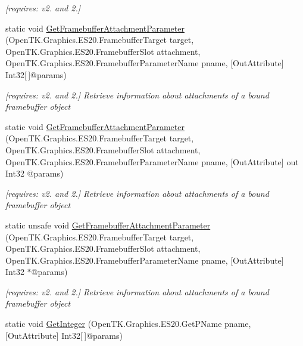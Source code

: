 \begin{DoxyCompactItemize}
\begin{DoxyCompactList}\small\item\em \mbox{[}requires\-: v2. and 2.\mbox{]}\end{DoxyCompactList}\item 
static void \hyperlink{class_open_t_k_1_1_graphics_1_1_e_s20_1_1_g_l_a0c54f4b1c208f1ace3f5b829b8820fed}{Get\-Framebuffer\-Attachment\-Parameter} (Open\-T\-K.\-Graphics.\-E\-S20.\-Framebuffer\-Target target, Open\-T\-K.\-Graphics.\-E\-S20.\-Framebuffer\-Slot attachment, Open\-T\-K.\-Graphics.\-E\-S20.\-Framebuffer\-Parameter\-Name pname, \mbox{[}Out\-Attribute\mbox{]} Int32\mbox{[}$\,$\mbox{]}@params)
\begin{DoxyCompactList}\small\item\em \mbox{[}requires\-: v2. and 2.\mbox{]} Retrieve information about attachments of a bound framebuffer object \end{DoxyCompactList}\item 
static void \hyperlink{class_open_t_k_1_1_graphics_1_1_e_s20_1_1_g_l_aee8f6f2a03c6cfccf9c15a876951eaa4}{Get\-Framebuffer\-Attachment\-Parameter} (Open\-T\-K.\-Graphics.\-E\-S20.\-Framebuffer\-Target target, Open\-T\-K.\-Graphics.\-E\-S20.\-Framebuffer\-Slot attachment, Open\-T\-K.\-Graphics.\-E\-S20.\-Framebuffer\-Parameter\-Name pname, \mbox{[}Out\-Attribute\mbox{]} out Int32 @params)
\begin{DoxyCompactList}\small\item\em \mbox{[}requires\-: v2. and 2.\mbox{]} Retrieve information about attachments of a bound framebuffer object \end{DoxyCompactList}\item 
static unsafe void \hyperlink{class_open_t_k_1_1_graphics_1_1_e_s20_1_1_g_l_a351cc70613fbc5c60f808d40e43ceeeb}{Get\-Framebuffer\-Attachment\-Parameter} (Open\-T\-K.\-Graphics.\-E\-S20.\-Framebuffer\-Target target, Open\-T\-K.\-Graphics.\-E\-S20.\-Framebuffer\-Slot attachment, Open\-T\-K.\-Graphics.\-E\-S20.\-Framebuffer\-Parameter\-Name pname, \mbox{[}Out\-Attribute\mbox{]} Int32 $\ast$@params)
\begin{DoxyCompactList}\small\item\em \mbox{[}requires\-: v2. and 2.\mbox{]} Retrieve information about attachments of a bound framebuffer object \end{DoxyCompactList}\item 
static void \hyperlink{class_open_t_k_1_1_graphics_1_1_e_s20_1_1_g_l_a5aa5e8c054e058a15e93dcadb6f3cff7}{Get\-Integer} (Open\-T\-K.\-Graphics.\-E\-S20.\-Get\-P\-Name pname, \mbox{[}Out\-Attribute\mbox{]} Int32\mbox{[}$\,$\mbox{]}@params)

\end{DoxyCompactItemize}
